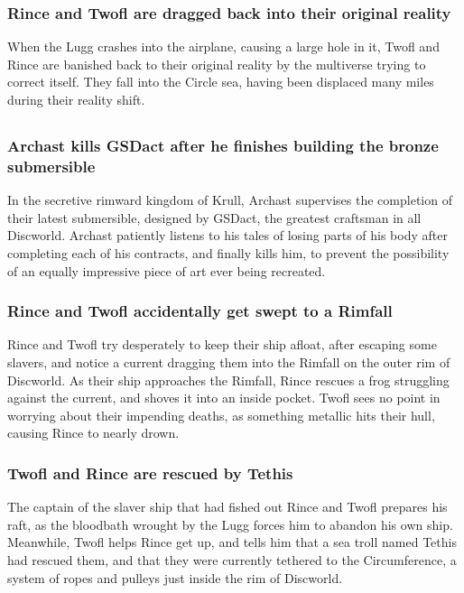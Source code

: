 \subsubsection{\Gls{Rince} and \Gls{Twofl} are dragged back into their original reality}
When the \Gls{Lugg} crashes into the airplane, causing a large hole in it, \Gls{Twofl} and
\Gls{Rince} are banished back to their original reality by the multiverse trying to correct itself.
They fall into the Circle sea, having been displaced many miles during their reality shift.

\subsection{}
\subsubsection{\Gls{Archast} kills \Gls{GSDact} after he finishes building the bronze submersible}
In the secretive rimward kingdom of Krull, \Gls{Archast} supervises the completion of their latest
submersible, designed by \Gls{GSDact}, the greatest craftsman in all Discworld. \Gls{Archast}
patiently listens to his tales of losing parts of his body after completing each of his contracts,
and finally kills him, to prevent the possibility of an equally impressive piece of art ever being
recreated.

\subsubsection{\Gls{Rince} and \Gls{Twofl} accidentally get swept to a Rimfall}
\Gls{Rince} and \Gls{Twofl} try desperately to keep their ship afloat, after escaping some slavers,
and notice a current dragging them into the Rimfall on the outer rim of Discworld. As their ship
approaches the Rimfall, \Gls{Rince} rescues a frog struggling against the current, and shoves it
into an inside pocket. \Gls{Twofl} sees no point in worrying about their impending deaths, as
something metallic hits their hull, causing \Gls{Rince} to nearly drown.

\subsubsection{\Gls{Twofl} and \Gls{Rince} are rescued by \Gls{Tethis}}
The captain of the slaver ship that had fished out \Gls{Rince} and \Gls{Twofl} prepares his raft,
as the bloodbath wrought by the \Gls{Lugg} forces him to abandon his own ship. Meanwhile,
\Gls{Twofl} helps \Gls{Rince} get up, and tells him that a sea troll named \Gls{Tethis} had rescued
them, and that they were currently tethered to the Circumference, a system of ropes and pulleys
just inside the rim of Discworld.

